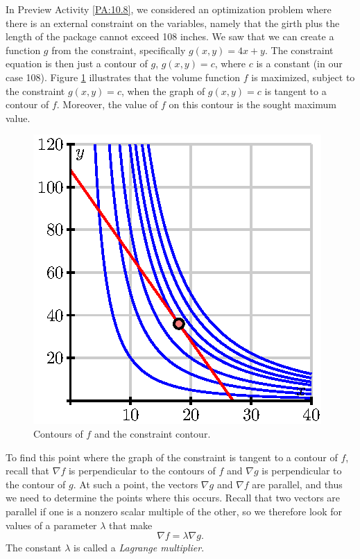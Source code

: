 In Preview Activity \ref{PA:10.8}, we considered an optimization problem where there is an external constraint on the variables, namely that the girth plus the length of the package cannot exceed 108 inches. We saw that we can create a function $g$ from the constraint, specifically $g(x,y) = 4x+y$.  The constraint equation is then just a contour of $g$, $g(x, y) = c$,  where $c$ is a constant (in our case 108). Figure \ref{F:10.8.Lagrange1} illustrates that the volume function $f$ is maximized, subject to the constraint $g(x, y) = c$, when the graph of $g(x, y) = c$ is tangent to a contour of $f$. Moreover, the value of $f$ on this contour is the sought maximum value.
\begin{figure}[h]
\begin{center}
  \includegraphics{figures/fig_10_8_postal_solution.eps}
\end{center}
\caption{Contours of $f$ and the constraint contour.}
\label{F:10.8.Lagrange1}
\end{figure}
To find this point where the graph of the constraint is tangent to a contour of $f$, recall that $\nabla f$ is perpendicular to the contours of $f$ and $\nabla g$ is perpendicular to the contour of $g$. At such a point, the vectors $\nabla g$ and $\nabla f$ are parallel, and thus we need to determine the points where this occurs. Recall that two vectors are parallel if one is a nonzero scalar multiple of the other, so we therefore look for values of a parameter $\lambda$ that make
\begin{equation}
\nabla f = \lambda \nabla g.\label{eq:10.8.Lagrange_ex1}
\end{equation}
The constant $\lambda$ is called a \emph{Lagrange multiplier}.

